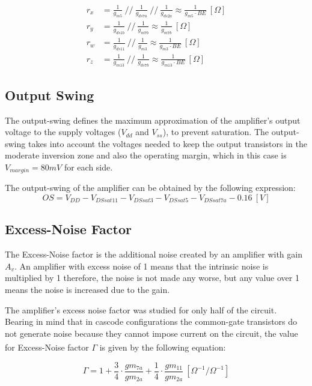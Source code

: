 \begin{align}
    r_x &= \frac{1}{g_{m5}} \ // \ \frac{1}{g_{ds7a}} \ // \ \frac{1}{g_{ds2a}}\approx \frac{1}{g_{m5} \cdot BE} \ [\Omega]\\
    r_y &= \frac{1}{g_{ds1b}} \ // \ \frac{1}{g_{m7b}} \approx \frac{1}{g_{m7b}} \ [\Omega]\\
    r_w &= \frac{1}{g_{ds11}} \ // \ \frac{1}{g_{m3}} \approx \frac{1}{g_{m3} \cdot BE} \ [\Omega]\\
    r_z &= \frac{1}{g_{m13}} \ // \ \frac{1}{g_{ds7b}} \approx \frac{1}{g_{m13} \cdot BE} \ [\Omega]
    \label{eq:resistances}
\end{align}

\subsection{Output Swing}
The output-swing defines the maximum approximation of the amplifier's output voltage to the supply voltages ($V_{dd}$ and $V_{ss}$), to prevent saturation. The output-swing takes into account the voltages needed to keep the output transistors in the moderate inversion zone and also the operating margin, which in this case is $V_{margin}=80mV$ for each side.

The output-swing of the amplifier can be obtained by the following expression:
\begin{equation}
    OS = V_{DD} - V_{DSsat11} - V_{DSsat3} - V_{DSsat5} - V_{DSsat7a} - 0.16 \ [V]
    \label{eq:OS}
\end{equation}

\subsection{Excess-Noise Factor}
The Excess-Noise factor is the additional noise created by an amplifier with gain $A_v$. An amplifier with excess noise of 1 means that the intrinsic noise is multiplied by 1 therefore, the noise is not made any worse, but any value over 1 means the noise is increased due to the gain.

The amplifier's excess noise factor was studied for only half of the circuit. Bearing in mind that in cascode configurations the common-gate transistors do not generate noise because they cannot impose current on the circuit, the value for Excess-Noise factor $\Gamma$ is given by the following equation\textsuperscript{\cite{artigo-prof}}:

\begin{equation}
    \Gamma = 1 + \frac{3}{4}\cdot \frac{gm_{7a}}{gm_{2a}} + \frac{1}{4}\cdot \frac{gm_{11}}{gm_{2a}} \ [\Omega ^{-1} / \Omega ^{-1}]
    \label{eq:ENF}
\end{equation}


